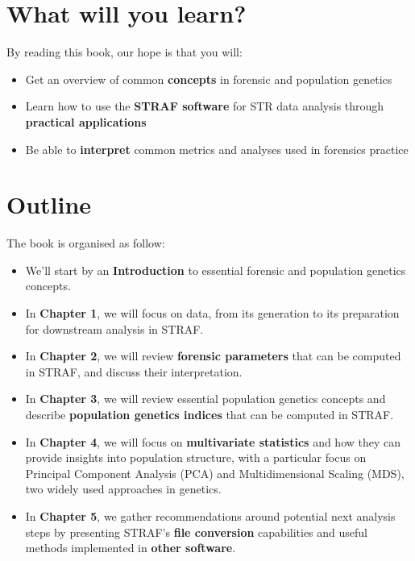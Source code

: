 \documentclass[
]{book}
\begin{document}
\hypertarget{what-will-you-learn}{%
\section*{What will you learn?}\label{what-will-you-learn}}

By reading this book, our hope is that you will:

\begin{itemize}
\item
  Get an overview of common \textbf{concepts} in forensic and population genetics
\item
  Learn how to use the \textbf{STRAF software} for STR data analysis through \textbf{practical applications}
\item
  Be able to \textbf{interpret} common metrics and analyses used in forensics practice
\end{itemize}

\hypertarget{outline}{%
\section*{Outline}\label{outline}}

The book is organised as follow:

\begin{itemize}
\item
  We'll start by an \textbf{Introduction} to essential forensic and population genetics concepts.
\item
  In \textbf{Chapter 1}, we will focus on data, from its generation to its preparation for
  downstream analysis in STRAF.
\item
  In \textbf{Chapter 2}, we will review \textbf{forensic parameters} that can be computed in STRAF,
  and discuss their interpretation.
\item
  In \textbf{Chapter 3}, we will review essential population genetics concepts and
  describe \textbf{population genetics indices} that can be computed in STRAF.
\item
  In \textbf{Chapter 4}, we will focus on \textbf{multivariate statistics} and how they can provide
  insights into population structure, with a particular focus on Principal Component
  Analysis (PCA) and Multidimensional Scaling (MDS), two widely used approaches in genetics.
\item
  In \textbf{Chapter 5}, we gather recommendations around potential next analysis steps
  by presenting STRAF's \textbf{file conversion} capabilities and useful methods implemented in
  \textbf{other software}.
\end{itemize}
\end{document}
